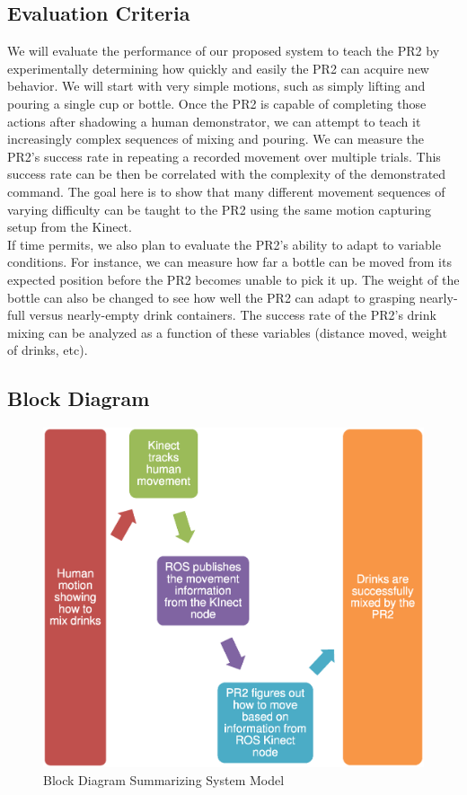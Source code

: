 \documentclass{sig-alternate}
\begin{document}
\subsection{Evaluation Criteria}
\label{subsec:eval_criteria}
We will evaluate the performance of our proposed system to teach the PR2 by experimentally determining how quickly and easily the PR2
can acquire new behavior. We will start with very simple motions, such as simply lifting and pouring a single cup or bottle. Once the PR2 is capable of completing those actions after shadowing a human demonstrator, we can attempt to teach it increasingly complex sequences of mixing and pouring. We can measure the PR2's success rate in repeating a recorded movement over multiple trials. This success rate can be then be correlated with the complexity of the demonstrated command. The goal here is to show that many different movement sequences of varying difficulty can be taught to the PR2 using the same motion capturing setup from the Kinect.\\
If time permits, we also plan to evaluate the PR2's ability to adapt to variable conditions. For instance, we can measure how far a bottle can be moved from its expected position before the PR2 becomes unable to pick it up. The weight of the bottle can also be changed to see how well the PR2 can adapt to grasping nearly-full versus nearly-empty drink containers. The success rate of the PR2's drink mixing can be analyzed as a function of these variables (distance moved, weight of drinks, etc).
\subsection{Block Diagram}
\label{subsec:block_diagram}

\begin{figure}[h!] 
	\begin{center}
		\includegraphics[width=1.0\linewidth]{flowchart}
	\end{center}
	\caption{Block Diagram Summarizing System Model}
	\label{fig:some_graph}
\end{figure}
\end{document}
